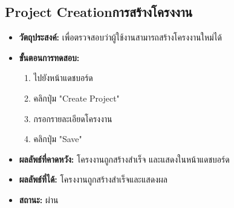 \subsection{\ifenglish Project Creation\else การสร้างโครงงาน\fi}
\begin{itemize}
  \item \textbf{วัตถุประสงค์:} เพื่อตรวจสอบว่าผู้ใช้งานสามารถสร้างโครงงานใหม่ได้
  \item \textbf{ขั้นตอนการทดสอบ:}
  \begin{enumerate}
    \item ไปยังหน้าแดชบอร์ด
    \item คลิกปุ่ม "Create Project"
    \item กรอกรายละเอียดโครงงาน
    \item คลิกปุ่ม "Save"
  \end{enumerate}
  \item \textbf{ผลลัพธ์ที่คาดหวัง:} โครงงานถูกสร้างสำเร็จ และแสดงในหน้าแดชบอร์ด
  \item \textbf{ผลลัพธ์ที่ได้:} โครงงานถูกสร้างสำเร็จและแสดงผล
  \item \textbf{สถานะ:} ผ่าน
\end{itemize}
